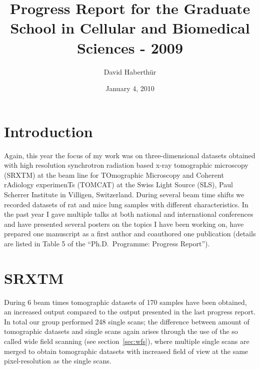 \documentclass[a4paper,twoside,DIV=calc]{scrartcl}
\title{Progress Report for the Graduate School in Cellular and Biomedical Sciences - 2009}
\author{David Haberth\"{u}r}
\date{January 4, 2010}
\begin{document}
\maketitle

\section{Introduction}
Again, this year the focus of my work was on three-dimensional datasets obtained with high resolution synchrotron radiation based x-ray tomographic microscopy (SRXTM) at the beam line for TOmographic Microscopy and Coherent rAdiology experimenTs (TOMCAT) at the Swiss Light Source (SLS), Paul Scherrer Institute in Villigen, Switzerland. During several beam time shifts we recorded datasets of rat and mice lung samples with different characteristics. In the past year I gave multiple talks at both national and international conferences and have presented several posters on the topics I have been working on, have prepared one manuscript as a first author and coauthored one publication (details are listed in Table 5 of the ``Ph.D.\ Programme: Progress Report'').

\section{SRXTM}\label{sec:srxtm}
During 6 beam times tomographic datasets of 170 samples have been obtained, an increased output compared to the output presented in the last progress report. In total our group performed 248 single scans; the difference between amount of tomographic datasets and single scans again arises through the use of the so called wide field scanning (see section~\ref{sec:wfs}), where multiple single scans are merged to obtain tomographic datasets with increased field of view at the same pixel-resolution as the single scans.
\end{document}
